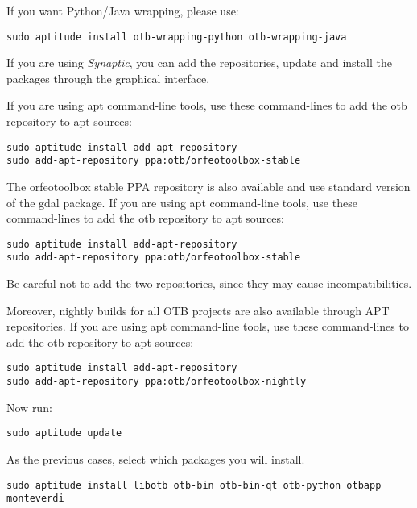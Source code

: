 If you want Python/Java wrapping, please use:
\begin{verbatim}
sudo aptitude install otb-wrapping-python otb-wrapping-java
\end{verbatim}

If you are using \emph{Synaptic}, you can add the repositories, update and install the packages through the
graphical interface.

If you are using apt command-line tools, use these command-lines to add the otb repository to apt sources:
\begin{verbatim}
sudo aptitude install add-apt-repository 
sudo add-apt-repository ppa:otb/orfeotoolbox-stable
\end{verbatim}


The orfeotoolbox stable PPA repository is also available and use standard version of the gdal package. 
If you are using apt command-line tools, use these command-lines to add the otb repository to apt sources:
\begin{verbatim}
sudo aptitude install add-apt-repository 
sudo add-apt-repository ppa:otb/orfeotoolbox-stable
\end{verbatim}

Be careful not to add the two repositories, since they may cause incompatibilities.

Moreover, nightly builds for all OTB projects are also available through APT repositories.
If you are using apt command-line tools, use these command-lines to add the otb repository to apt sources:
\begin{verbatim}
sudo aptitude install add-apt-repository 
sudo add-apt-repository ppa:otb/orfeotoolbox-nightly
\end{verbatim}
Now run:
\begin{verbatim}
sudo aptitude update
\end{verbatim}
As the previous cases, select which packages you will install.
\begin{verbatim}
sudo aptitude install libotb otb-bin otb-bin-qt otb-python otbapp monteverdi
\end{verbatim}

